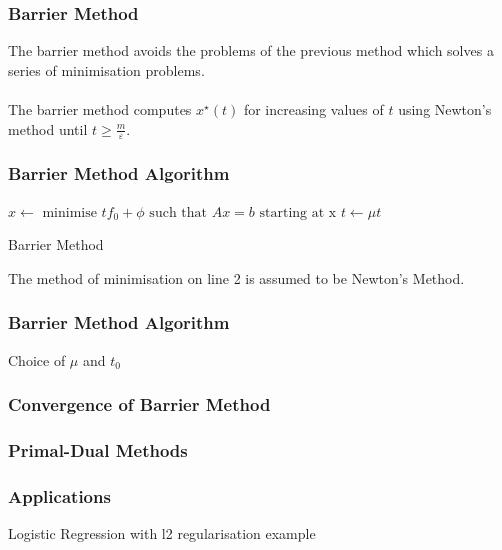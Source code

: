 \documentclass{beamer}
\begin{document}
\begin{frame}
    \frametitle{Barrier Method}
    The barrier method avoids the problems of the previous method which solves a
    series of minimisation problems.
    \\~\\
    The barrier method computes $x^{\star}(t)$ for increasing values of
    $t$ using Newton's method until $t \geq \frac{m}{\varepsilon}$.
\end{frame}

\begin{frame}
    \frametitle{Barrier Method Algorithm}
    \begin{algorithm}[H]
        \begin{algorithmic}[1]
            \STATE $x \leftarrow \text{ minimise } tf_{0} + \phi
            \text{ such that } Ax = b \text{ starting at x}$
            \STATE $t \leftarrow \mu t$
            \ENDWHILE
        \end{algorithmic}
        \caption{Barrier Method}
        \label{alg:seq}
    \end{algorithm}
    The method of minimisation on line 2 is assumed to be Newton's Method.
\end{frame}

\begin{frame}
    \frametitle{Barrier Method Algorithm}
    Choice of $\mu$ and $t_{0}$
\end{frame}

\begin{frame}
    \frametitle{Convergence of Barrier Method}
\end{frame}

\begin{frame}
    \frametitle{Primal-Dual Methods}
\end{frame}


\begin{frame}
    \frametitle{Applications}
    Logistic Regression with l2 regularisation example
\end{frame}


\end{document}
